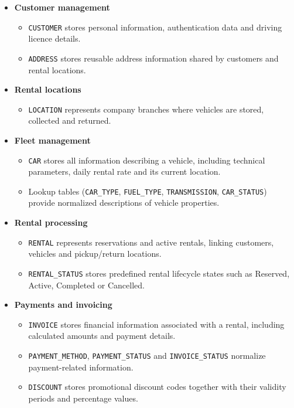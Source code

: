 \begin{itemize}
    \item \textbf{Customer management}
    \begin{itemize}
        \item \texttt{CUSTOMER} stores personal information, authentication data and driving licence details.
        \item \texttt{ADDRESS} stores reusable address information shared by customers and rental locations.
    \end{itemize}

    \item \textbf{Rental locations}
    \begin{itemize}
        \item \texttt{LOCATION} represents company branches where vehicles are stored, collected and returned.
    \end{itemize}

    \item \textbf{Fleet management}
    \begin{itemize}
        \item \texttt{CAR} stores all information describing a vehicle, including technical parameters, daily rental rate and its current location.
        \item Lookup tables (\texttt{CAR\_TYPE}, \texttt{FUEL\_TYPE}, \texttt{TRANSMISSION}, \texttt{CAR\_STATUS}) provide normalized descriptions of vehicle properties.
    \end{itemize}

    \item \textbf{Rental processing}
    \begin{itemize}
        \item \texttt{RENTAL} represents reservations and active rentals, linking customers, vehicles and pickup/return locations.
        \item \texttt{RENTAL\_STATUS} stores predefined rental lifecycle states such as Reserved, Active, Completed or Cancelled.
    \end{itemize}

    \item \textbf{Payments and invoicing}
    \begin{itemize}
        \item \texttt{INVOICE} stores financial information associated with a rental, including calculated amounts and payment details.
        \item \texttt{PAYMENT\_METHOD}, \texttt{PAYMENT\_STATUS} and \texttt{INVOICE\_STATUS} normalize payment-related information.
        \item \texttt{DISCOUNT} stores promotional discount codes together with their validity periods and percentage values.
    \end{itemize}


\end{itemize}
